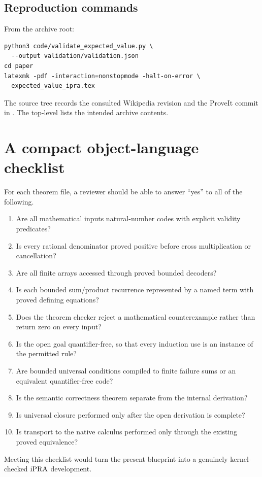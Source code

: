 \subsection{Reproduction commands}

From the archive root:

\begin{verbatim}
python3 code/validate_expected_value.py \
  --output validation/validation.json
cd paper
latexmk -pdf -interaction=nonstopmode -halt-on-error \
  expected_value_ipra.tex
\end{verbatim}

The source tree records the consulted Wikipedia revision and the ProveIt commit
in .  The top-level  lists the
intended archive contents.

\section{A compact object-language checklist}\label{app:checklist}

For each theorem file, a reviewer should be able to answer ``yes'' to all of
the following.

\begin{enumerate}
\item Are all mathematical inputs natural-number codes with explicit validity
  predicates?
\item Is every rational denominator proved positive before cross
  multiplication or cancellation?
\item Are all finite arrays accessed through proved bounded decoders?
\item Is each bounded sum/product recurrence represented by a named 
  term with proved defining equations?
\item Does the theorem checker reject a mathematical counterexample rather
  than return zero on every input?
\item Is the open goal quantifier-free, so that every induction use is an
  instance of the permitted rule?
\item Are bounded universal conditions compiled to finite failure sums or an
  equivalent quantifier-free code?
\item Is the semantic correctness theorem separate from the internal
  derivation?
\item Is universal closure performed only after the open derivation is
  complete?
\item Is transport to the native calculus performed only through the existing
  proved equivalence?
\end{enumerate}

Meeting this checklist would turn the present blueprint into a genuinely
kernel-checked \(\mathrm{iPRA}\) development.
